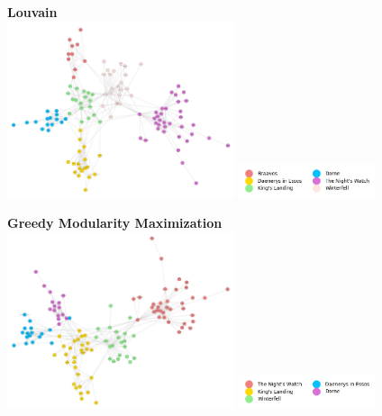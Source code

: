 \documentclass[10pt,twocolumn,letterpaper]{article}
\begin{document}
\begin{center}
    \textbf{Louvain} \\
    \includegraphics[width=0.5\textwidth]{img/s5/communities_louvain.jpg}
    \includegraphics[width=0.3\textwidth]{img/s5/louvain_legend.jpg}\\
    \caption{\small{$\#communities=6$, $modularity=0.67$}}
\end{center}



\begin{center}
    \textbf{Greedy Modularity Maximization}\\
    \includegraphics[width=0.5\textwidth]{img/s5/communities_gmm.jpg}
    \includegraphics[width=0.3\textwidth]{img/s5/gmm_legend.jpg}\\
    \caption{\small{$\#communities=5$, $modularity=0.66$}}
\end{center}
\end{document}
